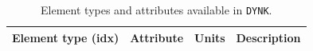 \begin{table}[ht]
\begin{center}
\caption{Element types and attributes available in \texttt{DYNK}.}
\label{tab:DYNK_SET} %
\begin{tabular}{|l | l | l | p{6cm}|}

  \hline
  \rowcolor{blue!30}
  Element type (idx) & Attribute & Units & Description \\
  \hline





\end{tabular}
\end{center}
\end{table}
